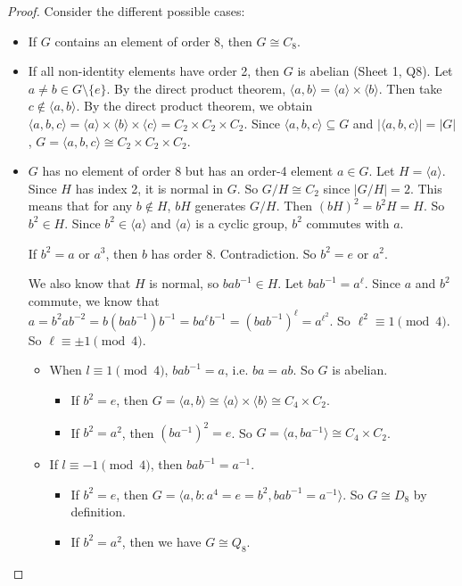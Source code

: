 \documentclass[a4paper]{article}
\theoremstyle{definition}
\newcommand{\bra}{\langle}
\newcommand{\ket}{\rangle}
\begin{document}
\begin{proof}
  Consider the different possible cases:
  \begin{itemize}
  \item If $G$ contains an element of order 8, then $G\cong C_8$.
  \item If all non-identity elements have order 2, then $G$ is abelian (Sheet 1, Q8). Let $a\not= b\in G\setminus\{e\}$. By the direct product theorem, $\bra a, b\ket = \bra a\ket\times\bra b\ket$. Then take $c\not\in \bra a, b\ket$. By the direct product theorem, we obtain $\bra a, b, c\ket = \bra a\ket\times\bra b\ket\times\bra c\ket = C_2\times C_2\times C_2$. Since $\bra a, b, c\ket\subseteq G$ and $|\bra a, b, c\ket| = |G|$, $G = \bra a, b, c\ket \cong C_2\times C_2\times C_2$.
  \item $G$ has no element of order 8 but has an order-4 element $a\in G$. Let $H = \bra a\ket$. Since $H$ has index 2, it is normal in $G$. So $G/H \cong C_2$ since $|G/H| = 2$. This means that for any $b\not\in H$, $bH$ generates $G/H$. Then $(bH)^2 = b^2H = H$. So $b^2\in H$. Since $b^2\in \bra a\ket$ and $\bra a\ket$ is a cyclic group, $b^2$ commutes with $a$.

If $b^2 = a$ or $a^3$, then $b$ has order 8. Contradiction. So $b^2 = e$ or $a^2$.

We also know that $H$ is normal, so $bab^{-1}\in H$. Let $bab^{-1} = a^\ell$. Since $a$ and $b^2$ commute, we know that $a = b^2 ab^{-2}  = b(bab^{-1})b^{-1} = ba^\ell b^{-1} = (bab^{-1})^{\ell} = a^{\ell^2}$. So $\ell^2 \equiv 1\pmod 4$. So $\ell \equiv \pm 1 \pmod 4$.

    \begin{itemize}
    \item When $l\equiv 1\pmod 4$, $bab^{-1} = a$, i.e. $ba = ab$. So $G$ is abelian.
      \begin{itemize}
      \item  If $b^2 = e$, then $G = \bra a, b\ket \cong \bra a\ket \times \bra b\ket \cong C_4\times C_2$.
      \item If $b^2 = a^2$, then $(ba^{-1})^2 = e$. So $G = \bra a, ba^{-1}\ket \cong C_4\times C_2$.
      \end{itemize}
    \item If $l \equiv -1\pmod 4$, then $bab^{-1} = a^{-1}$. 
      \begin{itemize}
      \item If $b^2 = e$, then $G = \bra a, b: a^4 = e = b^2, bab^{-1} = a^{-1}\ket$. So $G\cong D_8$ by definition.
      \item If $b^2 = a^2$, then we have $G\cong Q_8$. 
      \end{itemize}
    \end{itemize}
  \end{itemize}
\end{proof}
\end{document}
